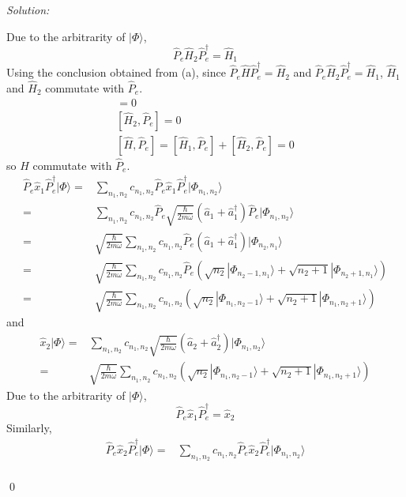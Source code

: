 \documentclass[12pt,a4paper]{article}
\newenvironment{sol}
    {\emph{Solution:}
    }
    {
    \qed
    }
\begin{document}
\begin{sol}
\begin{itemize}
\begin{equation}
\end{equation}
Due to the arbitrarity of $|\Phi\rangle$,
\begin{equation}
\hat{P}_e\hat{H}_2\hat{P}_e^{\dagger}=\hat{H}_1
\end{equation}
Using the conclusion obtained from (a), since $\hat{P}_e\hat{H}\hat{P}_e^{\dagger}=\hat{H}_2$ and $\hat{P}_e\hat{H}_2\hat{P}_e^{\dagger}=\hat{H}_1$, $\hat{H}_1$ and $\hat{H}_2$ commutate with $\hat{P}_e$.
\begin{gather}
[\hat{H}_1,\hat{P}_e]=0\\
[\hat{H}_2,\hat{P}_e]=0\\
[\hat{H},\hat{P}_e]=[\hat{H}_1,\hat{P}_e]+[\hat{H}_2,\hat{P}_e]=0
\end{gather}
so $\hat{H}$ commutate with $\hat{P}_e$.
\begin{align}
\nonumber\hat{P}_e\hat{x}_1\hat{P}_e^{\dagger}|\Phi\rangle=&\sum_{n_1,n_2}c_{n_1,n_2}\hat{P}_e\hat{x}_1\hat{P}_e^{\dagger}|\Phi_{n_1,n_2}\rangle\\
\nonumber=&\sum_{n_1,n_2}c_{n_1,n_2}\hat{P}_e\sqrt{\frac{\hbar}{2m\omega}}(\hat{a}_1+\hat{a}_1^{\dagger})\hat{P}_e|\Phi_{n_1,n_2}\rangle\\
\nonumber=&\sqrt{\frac{\hbar}{2m\omega}}\sum_{n_1,n_2}c_{n_1,n_2}\hat{P}_e(\hat{a}_1+\hat{a}_1^{\dagger})|\Phi_{n_2,n_1}\rangle\\
\nonumber=&\sqrt{\frac{\hbar}{2m\omega}}\sum_{n_1,n_2}c_{n_1,n_2}\hat{P}_e(\sqrt{n_2}|\Phi_{n_2-1,n_1}\rangle+\sqrt{n_2+1}|\Phi_{n_2+1,n_1}\rangle)\\
=&\sqrt{\frac{\hbar}{2m\omega}}\sum_{n_1,n_2}c_{n_1,n_2}(\sqrt{n_2}|\Phi_{n_1,n_2-1}\rangle+\sqrt{n_2+1}|\Phi_{n_1,n_2+1}\rangle)
\end{align}
and
\begin{align}
\nonumber\hat{x}_2|\Phi\rangle=&\sum_{n_1,n_2}c_{n_1,n_2}\sqrt{\frac{\hbar}{2m\omega}}(\hat{a}_2+\hat{a}_2^{\dagger})|\Phi_{n_1,n_2}\rangle\\
=&\sqrt{\frac{\hbar}{2m\omega}}\sum_{n_1,n_2}c_{n_1,n_2}(\sqrt{n_2}|\Phi_{n_1,n_2-1}\rangle+\sqrt{n_2+1}|\Phi_{n_1,n_2+1}\rangle)
\end{align}
Due to the arbitrarity of $|\Phi\rangle$,
\begin{equation}
\hat{P}_e\hat{x}_1\hat{P}_e^{\dagger}=\hat{x}_2
\end{equation}
Similarly,
\begin{align}
\nonumber\hat{P}_e\hat{x}_2\hat{P}_e^{\dagger}|\Phi\rangle=&\sum_{n_1,n_2}c_{n_1,n_2}\hat{P}_e\hat{x}_2\hat{P}_e^{\dagger}|\Phi_{n_1,n_2}\rangle\\

\end{align}
\end{itemize}
\end{sol}
\end{document}
